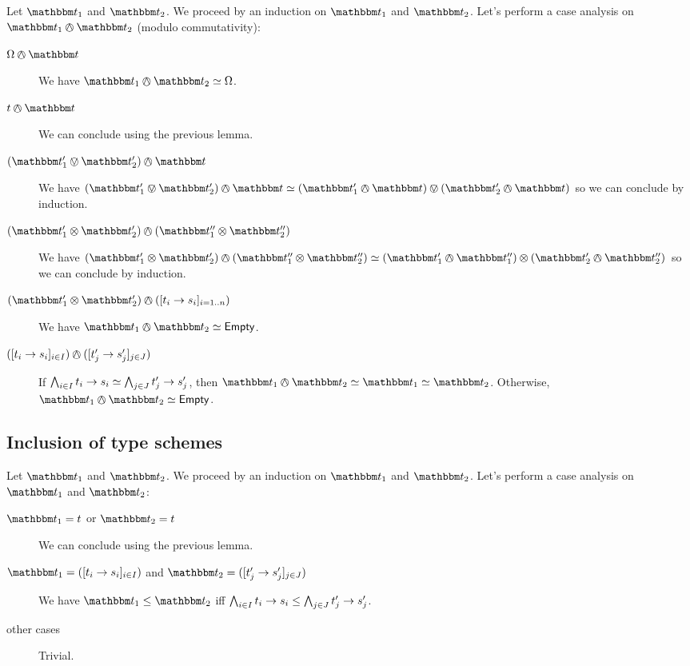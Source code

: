 \documentclass[a4paper]{article}
\theoremstyle{definition}
\begin{document}
    Let $\ts_1$ and $\ts_2$. We proceed by an induction on $\ts_1$ and $\ts_2$.
    Let's perform a case analysis on $\ts_1 \tsand \ts_2$ (modulo commutativity):
    \begin{description}
      \item[$\tsempty \tsand \ts$] We have $\ts_1 \tsand \ts_2 \simeq \tsempty$.
      \item[$t \tsand \ts$] We can conclude using the previous lemma.
      \item[$(\ts_1' \tsor \ts_2') \tsand \ts$] We have
      $(\ts_1' \tsor \ts_2') \tsand \ts \simeq (\ts_1' \tsand \ts) \tsor (\ts_2' \tsand \ts)$
      so we can conclude by induction.
      \item[$(\ts_1' \tstimes \ts_2') \tsand (\ts_1'' \tstimes \ts_2'')$] We have
      $(\ts_1' \tstimes \ts_2') \tsand (\ts_1'' \tstimes \ts_2'') \simeq (\ts_1' \tsand \ts_1'') \tstimes (\ts_2' \tsand \ts_2'')$
      so we can conclude by induction.
      \item[$(\ts_1' \tstimes \ts_2') \tsand (\tsfunone {t_i} {s_i}_{i=1..n})$] We have $\ts_1 \tsand \ts_2 \simeq \Empty$.
      \item[$(\tsfunone {t_i} {s_i}_{i\in I}) \tsand (\tsfunone {t_j'} {s_j'}_{j\in J})$]
      If $\bigwedge_{i\in I} t_i\to s_i \simeq \bigwedge_{j\in J} t_j'\to s_j'$,
      then $\ts_1 \tsand \ts_2 \simeq \ts_1 \simeq \ts_2$.
      Otherwise, $\ts_1 \tsand \ts_2 \simeq \Empty$.
    \end{description}

    \subsection{Inclusion of type schemes}

    Let $\ts_1$ and $\ts_2$. We proceed by an induction on $\ts_1$ and $\ts_2$.
    Let's perform a case analysis on $\ts_1$ and $\ts_2$:
    \begin{description}
      \item[$\ts_1 = t$ or $\ts_2 = t$] We can conclude using the previous lemma.
      \item[$\ts_1 = (\tsfunone {t_i} {s_i}_{i\in I})$ and $\ts_2 = (\tsfunone {t_j'} {s_j'}_{j\in J})$]
      We have $\ts_1 \leq \ts_2$ iff $\bigwedge_{i\in I} t_i\to s_i \leq \bigwedge_{j\in J} t_j'\to s_j'$.
      \item[other cases] Trivial.
    \end{description}
    
\end{document}
